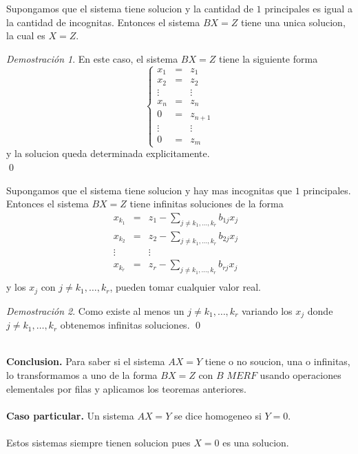 \documentclass{article}
\theoremstyle{definition}
\theoremstyle{definition}
\theoremstyle{remark}
\newtheorem*{demo}{Demostración}
\begin{document}
\begin{teo}
  Supongamos que el sistema tiene solucion y la cantidad de $1$ principales es igual a la cantidad de incognitas. Entonces el sistema $BX=Z$ tiene una unica solucion, la cual es $X=Z$. 
\end{teo}
\begin{demo}
  En este caso, el sistema $BX=Z$ tiene la siguiente forma \[
    \left\{
      \begin{array}{ccc} 
        x_1 & = & z_1 \\
        x_2 & = & z_2 \\
        \vdots & & \vdots \\
        x_n & = & z_n \\
        0 & = & z_{n+1} \\
        \vdots & & \vdots \\
        0 & = & z_{m}
      \end{array}
    \right.
  \]
  y la solucion queda determinada explicitamente. \\ 
  \qed 
\end{demo}\;
\begin{teo}
  Supongamos que el sistema tiene solucion y hay mas incognitas que $1$ principales. Entonces el sistema $BX=Z$ tiene infinitas soluciones de la forma 
 \[
 \begin{array}{ccccc} 
      x_{k_{1}} & = &z_1 -\sum_{j\neq k_1, \dots, k_r} b_{1j}x_{j} \\
      x_{k_{2}}& = &z_2 -\sum_{j\neq k_1, \dots, k_r} b_{2j}x_{j} &  \\
      \vdots & & \vdots  \\
 x_{k_{r}} & = &z_r -\sum_{j\neq k_1, \dots, k_r} b_{rj}x_{j} & \\
  \end{array}  \]
  y los $x_j$ con $j \neq k_1, \dots, k_r$, pueden tomar cualquier valor real.
\end{teo}
\begin{demo}
  Como existe al menos un $j \neq k_1, \dots, k_r$ variando los $x_j$ donde $j \neq k_1, \dots, k_r$ obtenemos infinitas soluciones. \qed
\end{demo}\;\\
\textbf{Conclusion.} Para saber si el sistema $AX=Y$ tiene o no soucion, una o infinitas, lo transformamos a uno de la forma $BX=Z$ con $B$ $MERF$ usando operaciones elementales por filas y aplicamos los teoremas anteriores. \\\\
\textbf{Caso particular.} Un sistema $AX=Y$ se dice homogeneo si $Y=0$. \\\\
 Estos sistemas siempre tienen solucion pues $X=0$ es una solucion.
\pagebreak 
\end{document}
